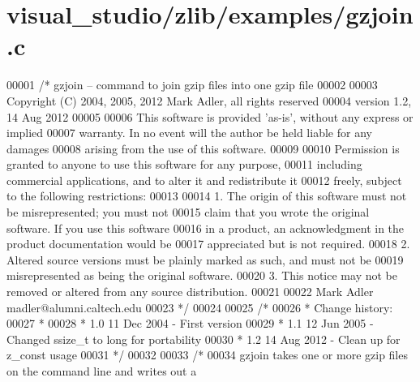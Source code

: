 \hypertarget{visual__studio_2zlib_2examples_2gzjoin_8c_source}{}\section{visual\+\_\+studio/zlib/examples/gzjoin.c}
\label{visual__studio_2zlib_2examples_2gzjoin_8c_source}

\begin{DoxyCode}
00001 \textcolor{comment}{/* gzjoin -- command to join gzip files into one gzip file}
00002 \textcolor{comment}{}
00003 \textcolor{comment}{  Copyright (C) 2004, 2005, 2012 Mark Adler, all rights reserved}
00004 \textcolor{comment}{  version 1.2, 14 Aug 2012}
00005 \textcolor{comment}{}
00006 \textcolor{comment}{  This software is provided 'as-is', without any express or implied}
00007 \textcolor{comment}{  warranty.  In no event will the author be held liable for any damages}
00008 \textcolor{comment}{  arising from the use of this software.}
00009 \textcolor{comment}{}
00010 \textcolor{comment}{  Permission is granted to anyone to use this software for any purpose,}
00011 \textcolor{comment}{  including commercial applications, and to alter it and redistribute it}
00012 \textcolor{comment}{  freely, subject to the following restrictions:}
00013 \textcolor{comment}{}
00014 \textcolor{comment}{  1. The origin of this software must not be misrepresented; you must not}
00015 \textcolor{comment}{     claim that you wrote the original software. If you use this software}
00016 \textcolor{comment}{     in a product, an acknowledgment in the product documentation would be}
00017 \textcolor{comment}{     appreciated but is not required.}
00018 \textcolor{comment}{  2. Altered source versions must be plainly marked as such, and must not be}
00019 \textcolor{comment}{     misrepresented as being the original software.}
00020 \textcolor{comment}{  3. This notice may not be removed or altered from any source distribution.}
00021 \textcolor{comment}{}
00022 \textcolor{comment}{  Mark Adler    madler@alumni.caltech.edu}
00023 \textcolor{comment}{ */}
00024 
00025 \textcolor{comment}{/*}
00026 \textcolor{comment}{ * Change history:}
00027 \textcolor{comment}{ *}
00028 \textcolor{comment}{ * 1.0  11 Dec 2004     - First version}
00029 \textcolor{comment}{ * 1.1  12 Jun 2005     - Changed ssize\_t to long for portability}
00030 \textcolor{comment}{ * 1.2  14 Aug 2012     - Clean up for z\_const usage}
00031 \textcolor{comment}{ */}
00032 
00033 \textcolor{comment}{/*}
00034 \textcolor{comment}{   gzjoin takes one or more gzip files on the command line and writes out a}

\end{DoxyCode}
